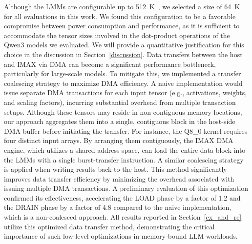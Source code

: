 Although the LMMs are configurable up to \SI{512}{K\byte}, we selected a size of \SI{64}{K\byte} for all evaluations in this work. 
We found this configuration to be a favorable compromise between power consumption and performance, as it is sufficient to accommodate the tensor sizes involved in the dot-product operations of the Qwen3 models we evaluated. 
We will provide a quantitative justification for this choice in the discussion in Section~\ref{discussion}.
Data transfers between the host and IMAX via DMA can become a significant performance bottleneck, particularly for large-scale models. 
To mitigate this, we implemented a transfer coalescing strategy to maximize DMA efficiency. 
A naive implementation would issue separate DMA transactions for each input tensor (e.g., activations, weights, and scaling factors), incurring substantial overhead from multiple transaction setups. 
Although these tensors may reside in non-contiguous memory locations, our approach aggregates them into a single, contiguous block in the host-side DMA buffer before initiating the transfer.
For instance, the Q8\_0 kernel requires four distinct input arrays. 
By arranging them contiguously, the IMAX DMA engine, which utilizes a shared address space, can load the entire data block into the LMMs with a single burst-transfer instruction. 
A similar coalescing strategy is applied when writing results back to the host. 
This method significantly improves data transfer efficiency by minimizing the overhead associated with issuing multiple DMA transactions.
A preliminary evaluation of this optimization confirmed its effectiveness, accelerating the LOAD phase by a factor of 1.2 and the DRAIN phase by a factor of 4.8 compared to the naive implementation, which is a non-coalesced approach. 
All results reported in Section~\ref{ex_and_re} utilize this optimized data transfer method, demonstrating the critical importance of such low-level optimizations in memory-bound LLM workloads.




